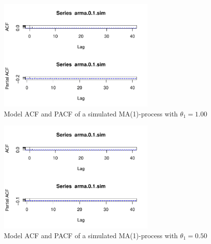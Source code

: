 \documentclass[11pt,a4paper]{article}
\begin{document}
\begin{figure}[H]
    \centering
    \includegraphics[width=0.7\textwidth]{sim_ma_1_00}
    \caption{Model ACF and PACF of a simulated MA(1)-process with $\theta_1 = 1.00$}
    \label{fig:sim_ma_1_00}
\end{figure}

\begin{figure}[H]
    \centering
    \includegraphics[width=0.7\textwidth]{sim_ma_1_05}
    \caption{Model ACF and PACF of a simulated MA(1)-process with $\theta_1 = 0.50$}
    \label{fig:sim_ma_1_05}
\end{figure}
\end{document}
